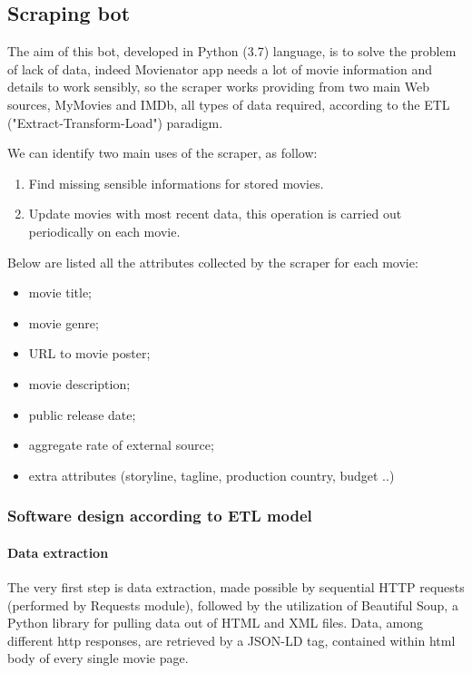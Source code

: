 \documentclass[11pt]{article}
\begin{document}
\subsection{Scraping bot}
The aim of this bot, developed in Python (3.7) language, is to solve the problem of lack of data, indeed Movienator app needs a lot of movie information and details to work sensibly, so the scraper works providing from two main Web sources, MyMovies and IMDb, all types of data required, according to the ETL ("Extract-Transform-Load") paradigm.

We can identify two main uses of the scraper, as follow:
\begin{enumerate}
    \item Find missing sensible informations for stored movies.
    \item Update movies with most recent data, this operation is carried out periodically on each movie.
\end{enumerate}
Below are listed all the attributes collected by the scraper for each movie:\newline
\begin{itemize}
    \item movie title;
    \item movie genre;
    \item URL to movie poster;
    \item movie description;
    \item public release date;
    \item aggregate rate of external source;
    \item extra attributes (storyline, tagline, production country, budget ..)
\end{itemize}

\subsubsection{Software design according to ETL model}
\paragraph{Data extraction}
The very first step is data extraction, made possible by sequential HTTP requests (performed by Requests module), followed by the utilization of Beautiful Soup, a Python library for pulling data out of HTML and XML files.
Data, among different http responses, are retrieved by a JSON-LD tag, contained within html body of every single movie page.

\end{document}
